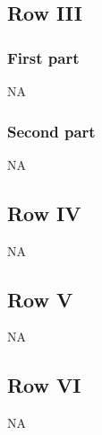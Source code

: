 \documentclass[9pt]{article}
\numberwithin{equation}{section}
\begin{document}
 \subsection{Row III}
 \subsubsection{First part}
 \textsc{NA}
\subsubsection{Second part}
\textsc{NA}
\subsection{Row IV}
\textsc{NA}
\subsection{Row V}
\textsc{NA}
\subsection{Row VI}
\textsc{NA}
\end{document}
